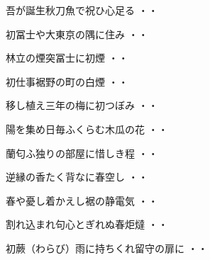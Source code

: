 \begin{shiika}吾が誕生秋刀魚で祝ひ心足る
\hfill{・・}\end{shiika}
\vspace{0.6cm}
\begin{shiika}初冨士や大東京の隅に住み
\hfill{・・}\end{shiika}
\vspace{0.6cm}
\begin{shiika}林立の煙突冨士に初煙
\hfill{・・}\end{shiika}
\vspace{0.6cm}
\begin{shiika}初仕事裾野の町の白煙
\hfill{・・}\end{shiika}
\vspace{0.6cm}
\begin{shiika}移し植え三年の梅に初つぼみ
\hfill{・・}\end{shiika}
\vspace{0.6cm}
\begin{shiika}陽を集め日毎ふくらむ木瓜の花
\hfill{・・}\end{shiika}
\vspace{0.6cm}
\begin{shiika}蘭匂ふ独りの部屋に惜しき程
\hfill{・・}\end{shiika}
\vspace{0.6cm}
\begin{shiika}逆縁の香たく背なに春空し
\hfill{・・}\end{shiika}
\vspace{0.6cm}
\begin{shiika}春や憂し着かえし裾の静電気
\hfill{・・}\end{shiika}
\vspace{0.6cm}
\begin{shiika}割れ込まれ句心とぎれぬ春炬燵
\hfill{・・}\end{shiika}
\vspace{0.6cm}
\begin{shiika}初蕨（わらび）雨に持ちくれ留守の扉に
\hfill{・・}\end{shiika}
\vspace{0.6cm}
